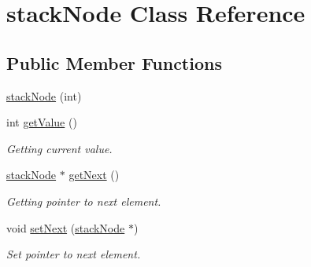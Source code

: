 \hypertarget{classstack_node}{\section{stack\-Node Class Reference}
\label{classstack_node}
}
\subsection*{Public Member Functions}
\begin{DoxyCompactItemize}
\item 
\hyperlink{classstack_node_a49b068c5c79fb609d9d206b9505d0e67}{stack\-Node} (int)
\item 
\hypertarget{classstack_node_a5d05b4c411b388ffee21394b3308fffd}{int \hyperlink{classstack_node_a5d05b4c411b388ffee21394b3308fffd}{get\-Value} ()}\label{classstack_node_a5d05b4c411b388ffee21394b3308fffd}

\begin{DoxyCompactList}\small\item\em Getting current value. \end{DoxyCompactList}\item 
\hypertarget{classstack_node_ad6a146354a42f70c7b4d2dbcb46cc1fb}{\hyperlink{classstack_node}{stack\-Node} $\ast$ \hyperlink{classstack_node_ad6a146354a42f70c7b4d2dbcb46cc1fb}{get\-Next} ()}\label{classstack_node_ad6a146354a42f70c7b4d2dbcb46cc1fb}

\begin{DoxyCompactList}\small\item\em Getting pointer to next element. \end{DoxyCompactList}\item 
\hypertarget{classstack_node_a0fda16bdb32acb13a4026e5ca83529f0}{void \hyperlink{classstack_node_a0fda16bdb32acb13a4026e5ca83529f0}{set\-Next} (\hyperlink{classstack_node}{stack\-Node} $\ast$)}\label{classstack_node_a0fda16bdb32acb13a4026e5ca83529f0}

\begin{DoxyCompactList}\small\item\em Set pointer to next element. \end{DoxyCompactList}\end{DoxyCompactItemize}


